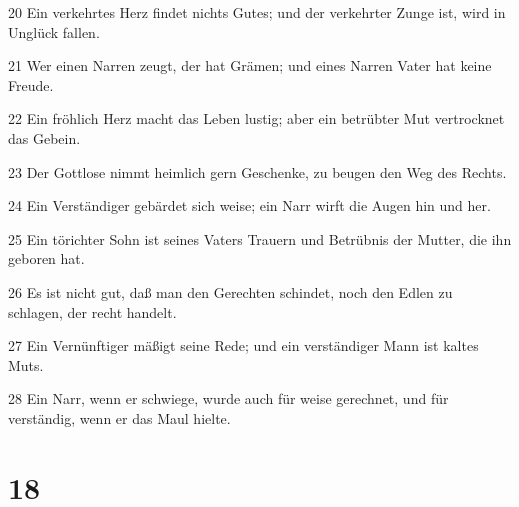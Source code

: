 \par 20 Ein verkehrtes Herz findet nichts Gutes; und der verkehrter Zunge ist, wird in Unglück fallen.
\par 21 Wer einen Narren zeugt, der hat Grämen; und eines Narren Vater hat keine Freude.
\par 22 Ein fröhlich Herz macht das Leben lustig; aber ein betrübter Mut vertrocknet das Gebein.
\par 23 Der Gottlose nimmt heimlich gern Geschenke, zu beugen den Weg des Rechts.
\par 24 Ein Verständiger gebärdet sich weise; ein Narr wirft die Augen hin und her.
\par 25 Ein törichter Sohn ist seines Vaters Trauern und Betrübnis der Mutter, die ihn geboren hat.
\par 26 Es ist nicht gut, daß man den Gerechten schindet, noch den Edlen zu schlagen, der recht handelt.
\par 27 Ein Vernünftiger mäßigt seine Rede; und ein verständiger Mann ist kaltes Muts.
\par 28 Ein Narr, wenn er schwiege, wurde auch für weise gerechnet, und für verständig, wenn er das Maul hielte.

\chapter{18}

